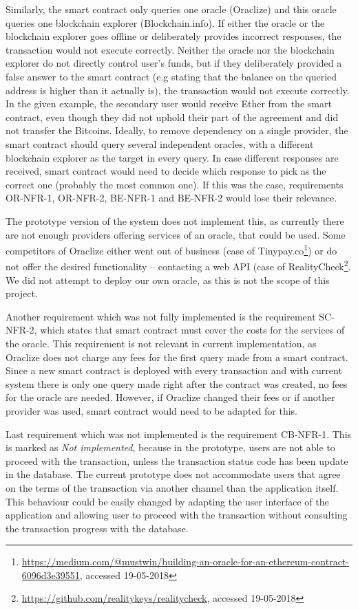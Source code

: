 Similarly, the smart contract only queries one oracle (Oraclize) and this oracle queries one blockchain explorer (Blockchain.info). If either the oracle or the blockchain explorer goes offline or deliberately provides incorrect responses, the transaction would not execute correctly. Neither the oracle nor the blockchain explorer do not directly control user's funds, but if they deliberately provided a false answer to the smart contract (e.g stating that the balance on the queried address is higher than it actually is), the transaction would not execute correctly. In the given example, the secondary user would receive Ether from the smart contract, even though they did not uphold their part of the agreement and did not transfer the Bitcoins. Ideally, to remove dependency on a single provider, the smart contract should query several independent oracles, with a different blockchain explorer as the target in every query. In case different responses are received, smart contract would need to decide which response to pick as the correct one (probably the most common one). If this was the case, requirements OR-NFR-1, OR-NFR-2, BE-NFR-1 and BE-NFR-2 would lose their relevance.

The prototype version of the system does not implement this, as currently there are not enough providers offering services of an oracle, that could be used. Some competitors of Oraclize either went out of business (case of Tinypay.co\footnote{\url{https://medium.com/@mustwin/building-an-oracle-for-an-ethereum-contract-6096d3e39551}, accessed 19-05-2018}) or do not offer the desired functionality -- contacting a web API (case of RealityCheck\footnote{\url{https://github.com/realitykeys/realitycheck}, accessed 19-05-2018}. We did not attempt to deploy our own oracle, as this is not the scope of this project.

Another requirement which was not fully implemented is the requirement SC-NFR-2, which states that smart contract must cover the costs for the services of the oracle. This requirement is not relevant in current implementation, as Oraclize does not charge any fees for the first query made from a smart contract. Since a new smart contract is deployed with every transaction and with current system there is only one query made right after the contract was created, no fees for the oracle are needed. However, if Oraclize changed their fees or if another provider was used, smart contract would need to be adapted for this.

Last requirement which was not implemented is the requirement CB-NFR-1. This is marked as \textit{Not implemented}, because in the prototype, users are not able to proceed with the transaction, unless the transaction status code has been update in the database. The current prototype does not accommodate users that agree on the terms of the transaction via another channel than the application itself. This behaviour could be easily changed by adapting the user interface of the application and allowing user to proceed with the transaction without consulting the transaction progress with the database.
%
%
%
%
%

